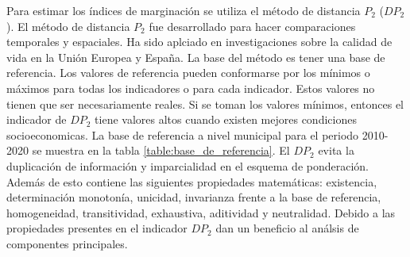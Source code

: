 Para estimar los índices de marginación se utiliza el método de distancia $P_2$\cite{Trapero_1977} ($DP_2$). El método de distancia $P_2$ fue desarrollado para hacer comparaciones temporales y espaciales. Ha sido aplciado en investigaciones sobre la calidad de vida en la Unión Europea y España\cite{Somarriba_2008,Zarzoza_2012,Zarzoza_1996,Nayak_2012}. La base del método es tener una base de referencia. Los valores de referencia pueden conformarse por los mínimos o máximos para todas los indicadores o para cada indicador. Estos valores no tienen que ser necesariamente reales. Si se toman los valores mínimos, entonces el indicador de $DP_2$ tiene valores altos cuando existen mejores condiciones socioeconomicas. La base de referencia a nivel municipal para el periodo 2010-2020 se muestra en la tabla \ref{table:base_de_referencia}\cite{CONAPO_2022}. El $DP_2$ evita la duplicación de información y imparcialidad en el esquema de ponderación. Además de esto contiene las siguientes propiedades matemáticas: existencia, determinación monotonía, unicidad, invarianza frente a la base de referencia, homogeneidad, transitividad, exhaustiva, aditividad y neutralidad\cite{Somarriba_2008,Espina_2012}. Debido a las propiedades presentes en el indicador $DP_2$ dan un beneficio al análsis de componentes principales\cite{Somarriba_2008}.

